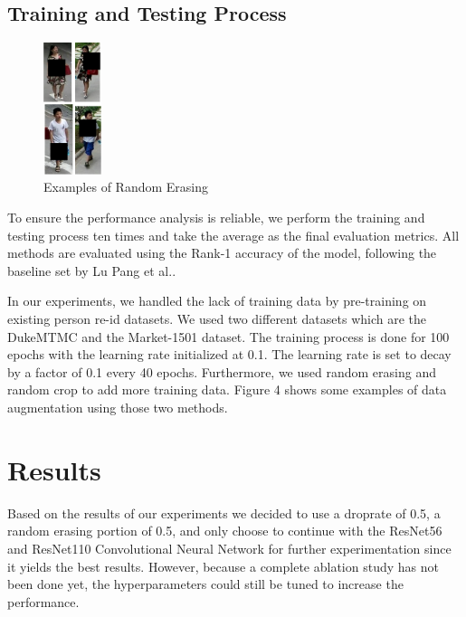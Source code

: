 \documentclass[conference]{IEEEtran}
\begin{document}
	\vspace{1ex}

	\subsection{Training and Testing Process}
	\vspace{1ex}
	
	\begin{figure}[h!] \centering
		\includegraphics[width=0.15\textwidth]{img/RandomErasing.png}
		\caption{Examples of Random Erasing}
		\label{fig:4}
	\end{figure}
	
	To ensure the performance analysis is reliable, we perform the training and testing process ten times and take the average as the final evaluation metrics. All methods are evaluated using the Rank-1 accuracy of the model, following the baseline set by Lu Pang et al..
	
	\pagebreak
	
	In our experiments, we handled the lack of training data by pre-training on existing person re-id datasets. We used two different datasets which are the DukeMTMC and the Market-1501 dataset. The training process is done for 100 epochs with the learning rate initialized at 0.1. The learning rate is set to decay by a factor of 0.1 every 40 epochs. Furthermore, we used random erasing and random crop to add more training data. Figure 4 shows some examples of data augmentation using those two methods.
	
	\section{Results}
	\vspace{1ex}
	
	Based on the results of our experiments we decided to use a droprate of 0.5, a random erasing portion of 0.5, and only choose to continue with the ResNet56 and ResNet110 Convolutional Neural Network for further experimentation since it yields the best results. However, because a complete ablation study has not been done yet, the hyperparameters could still be tuned to increase the performance. 
	
\end{document}
